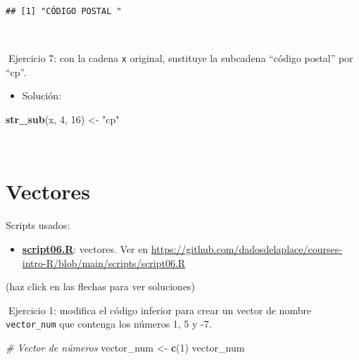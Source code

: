 \documentclass[11pt,]{book}
\newenvironment{Shaded}{\begin{snugshade}}{\end{snugshade}}
\newcommand{\CommentTok}[1]{\textcolor[rgb]{0.37,0.37,0.37}{\textit{#1}}}
\newcommand{\DecValTok}[1]{\textcolor[rgb]{0.06,0.06,0.06}{#1}}
\newcommand{\KeywordTok}[1]{\textcolor[rgb]{0.27,0.27,0.27}{\textbf{#1}}}
\newcommand{\NormalTok}[1]{#1}
\newcommand{\StringTok}[1]{\textcolor[rgb]{0.5,0.5,0.5}{#1}}
\providecommand{\tightlist}{%
  \setlength{\itemsep}{0pt}\setlength{\parskip}{0pt}}
\begin{document}
\begin{verbatim}
## [1] "CÓDIGO POSTAL "
\end{verbatim}

~

📝Ejercicio 7: con la cadena \texttt{x} original, sustituye la subcadena ``código postal'' por ``cp''.

\begin{itemize}
\tightlist
\item
  Solución:
\end{itemize}

\begin{Shaded}
\begin{Highlighting}[]
\KeywordTok{str_sub}\NormalTok{(x, }\DecValTok{4}\NormalTok{, }\DecValTok{16}\NormalTok{) <-}\StringTok{ "cp"}
\end{Highlighting}
\end{Shaded}

~

\hypertarget{vectores}{%
\section{Vectores}\label{vectores}}

\begin{blackbox}

Scripts usados:

\begin{itemize}
\tightlist
\item
  \href{https://github.com/dadosdelaplace/courses-intro-R/blob/main/scripts/script06.R}{\textbf{script06.R}}: vectores. Ver en \url{https://github.com/dadosdelaplace/courses-intro-R/blob/main/scripts/script06.R}
\end{itemize}


\end{blackbox}

(haz click en las flechas para ver soluciones)

📝Ejercicio 1: modifica el código inferior para crear un vector de nombre \texttt{vector\_num} que contenga los números 1, 5 y -7.

\begin{Shaded}
\begin{Highlighting}[]
\CommentTok{# Vector de números}
\NormalTok{vector_num <-}\StringTok{ }\KeywordTok{c}\NormalTok{(}\DecValTok{1}\NormalTok{)}
\NormalTok{vector_num}
\end{Highlighting}
\end{Shaded}
\end{document}
